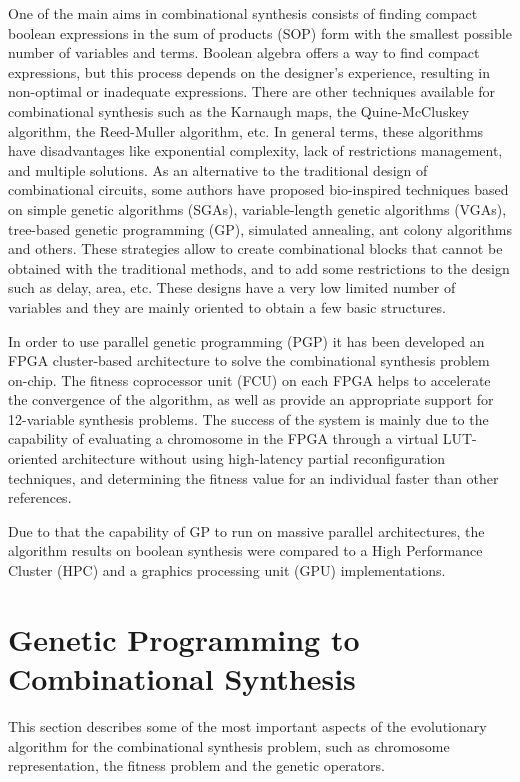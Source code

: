 \documentclass[runningheads,a4paper]{llncs}
\begin{document}
One of the main aims in combinational synthesis consists of finding compact boolean expressions in the sum of products (SOP) form with the smallest possible number of variables and terms. Boolean algebra offers a way to find compact expressions, but this process depends on the designer's experience, resulting in non-optimal or inadequate expressions. There are other techniques available for combinational synthesis such as the Karnaugh maps, the Quine-McCluskey algorithm, the Reed-Muller algorithm, etc. In general terms, these algorithms have disadvantages like exponential complexity, lack of restrictions management, and multiple solutions.
As an alternative to the traditional design of combinational circuits, some authors have proposed bio-inspired techniques based on simple genetic algorithms (SGAs), variable-length genetic algorithms (VGAs), tree-based genetic programming (GP), simulated annealing, ant colony algorithms and others. These strategies allow to create combinational blocks that cannot be obtained with the traditional methods, and to add some restrictions to the design such as delay, area, etc. These designs have a very low limited
number of variables \cite{DGJH98} and they are mainly oriented to obtain a few basic structures.

In order to use parallel genetic programming (PGP) it has been developed an FPGA cluster-based architecture to solve the combinational synthesis problem on-chip. The fitness coprocessor unit (FCU) on each FPGA helps to accelerate the convergence of the algorithm, as well as provide an appropriate support for 12-variable synthesis problems. The success of the system is mainly due to the capability of evaluating a chromosome in the FPGA through a virtual LUT-oriented architecture without using high-latency partial reconfiguration techniques, and determining the fitness value for an individual faster than other references. 

Due to that the capability of GP to run on massive parallel architectures, the algorithm results on boolean synthesis were compared to a High Performance Cluster (HPC) and a graphics processing unit (GPU) implementations. 

\section{Genetic Programming to Combinational Synthesis}
This section describes some of the most important aspects of the evolutionary algorithm for the combinational synthesis problem, such as chromosome representation, the fitness problem and the genetic operators.
\end{document}
